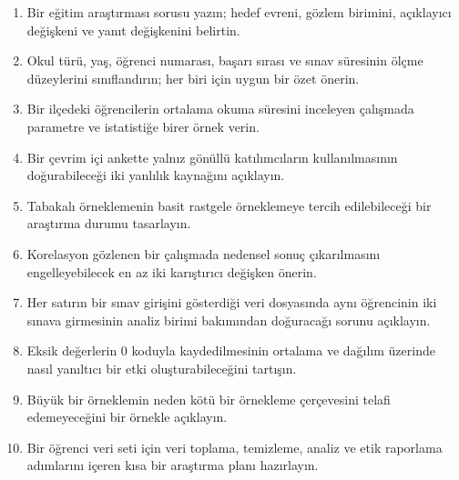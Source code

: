 \begin{enumerate}
  \item Bir eğitim araştırması sorusu yazın; hedef evreni, gözlem birimini,
  açıklayıcı değişkeni ve yanıt değişkenini belirtin.
  \item Okul türü, yaş, öğrenci numarası, başarı sırası ve sınav süresinin
  ölçme düzeylerini sınıflandırın; her biri için uygun bir özet önerin.
  \item Bir ilçedeki öğrencilerin ortalama okuma süresini inceleyen çalışmada
  parametre ve istatistiğe birer örnek verin.
  \item Bir çevrim içi ankette yalnız gönüllü katılımcıların kullanılmasının
  doğurabileceği iki yanlılık kaynağını açıklayın.
  \item Tabakalı örneklemenin basit rastgele örneklemeye tercih edilebileceği
  bir araştırma durumu tasarlayın.
  \item Korelasyon gözlenen bir çalışmada nedensel sonuç çıkarılmasını
  engelleyebilecek en az iki karıştırıcı değişken önerin.
  \item Her satırın bir sınav girişini gösterdiği veri dosyasında aynı
  öğrencinin iki sınava girmesinin analiz birimi bakımından doğuracağı sorunu
  açıklayın.
  \item Eksik değerlerin 0 koduyla kaydedilmesinin ortalama ve dağılım üzerinde
  nasıl yanıltıcı bir etki oluşturabileceğini tartışın.
  \item Büyük bir örneklemin neden kötü bir örnekleme çerçevesini telafi
  edemeyeceğini bir örnekle açıklayın.
  \item Bir öğrenci veri seti için veri toplama, temizleme, analiz ve etik
  raporlama adımlarını içeren kısa bir araştırma planı hazırlayın.
\end{enumerate}